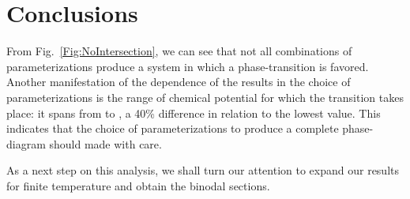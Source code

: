 \documentclass[prc, reprint, amsmath, floatfix, linenumbers,10pt]{revtex4-1}
\begin{document}
\section{Conclusions}

From Fig.~\ref{Fig:NoIntersection}, we can see that not all combinations of parameterizations produce a system in which a phase-transition is favored. Another manifestation of the dependence of the results in the choice of parameterizations is the range of chemical potential for which the transition takes place: it spans from  to , a 40\% difference in relation to the lowest value. This indicates that the choice of parameterizations to produce a complete phase-diagram should made with care.

As a next step on this analysis, we shall turn our attention to expand our results for finite temperature and obtain the binodal sections.

%
%







\end{document}
